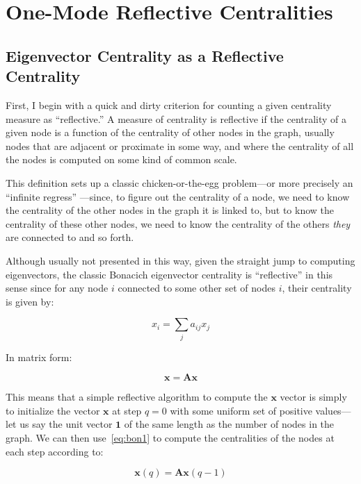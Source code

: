 \documentclass[a4paper,fleqn]{cas-sc}
\begin{document}
\section{One-Mode Reflective Centralities}
\subsection{Eigenvector Centrality as a Reflective Centrality}
First, I begin with a quick and dirty criterion for counting a given centrality measure as ``reflective.'' A measure of centrality is reflective if the centrality of a given node is a function of the centrality of other nodes in the graph, usually nodes that are adjacent or proximate in some way, and where the centrality of all the nodes is computed on some kind of common scale. 

This definition sets up a classic chicken-or-the-egg problem---or more precisely an ``infinite regress'' \citep[234-235]{seeley49}---since, to figure out the centrality of a node, we need to know the centrality of the other nodes in the graph it is linked to, but to know the centrality of these other nodes, we need to know the centrality of the others \textit{they} are connected to and so forth. 

Although usually not presented in this way, given the straight jump to computing eigenvectors, the classic Bonacich eigenvector centrality is ``reflective'' in this sense since for any node $i$ connected to some other set of nodes $i$, their centrality is given by:

\begin{equation}
    x_i = \sum_j a_{ij}x_j
    \label{eq:bon1}
\end{equation}

In matrix form:

\begin{equation}
    \mathbf{x} = \mathbf{A} \mathbf{x}
    \label{eq:bon2}
\end{equation}

This means that a simple reflective algorithm to compute the $\mathbf{x}$ vector is simply to initialize the vector $\mathbf{x}$ at step $q = 0$ with some uniform set of positive values---let us say the unit vector $\mathbf{1}$ of the same length as the number of nodes in the graph. We can then use~\ref{eq:bon1} to compute the centralities of the nodes at each step according to:

\begin{equation}
    \mathbf{x}(q) = \mathbf{A} \mathbf{x}(q - 1)
    \label{eq:bon3}
\end{equation}
\end{document}
